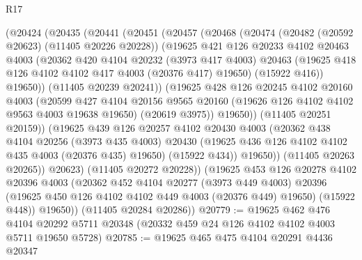 \begin{lexlean}{R17}
\begin{coremodule}
          (@20424
            (@20435
              (@20441
                (@20451
                  (@20457
                    (@20468
                      (@20474
                        (@20482 (@20592 @20623) (@11405 @20226 @20228))
                        (@19625
                          @421
                          @126
                          @20233
                          @4102
                          @20463
                          @4003
                          (@20362
                            @420
                            @4104
                            @20232
                            (@3973 @417 @4003)
                            @20463
                            (@19625 @418 @126 @4102 @4102 @417 @4003 (@20376 @417) @19650)
                            (@15922 @416))
                          @19650))
                      (@11405 @20239 @20241))
                    (@19625
                      @428
                      @126
                      @20245
                      @4102
                      @20160
                      @4003
                      (@20599
                        @427
                        @4104
                        @20156
                        @9565
                        @20160
                        (@19626 @126 @4102 @4102 @9563 @4003 @19638 @19650)
                        (@20619 @3975))
                      @19650))
                  (@11405 @20251 @20159))
                (@19625
                  @439
                  @126
                  @20257
                  @4102
                  @20430
                  @4003
                  (@20362
                    @438
                    @4104
                    @20256
                    (@3973 @435 @4003)
                    @20430
                    (@19625 @436 @126 @4102 @4102 @435 @4003 (@20376 @435) @19650)
                    (@15922 @434))
                  @19650))
              (@11405 @20263 @20265))
            @20623)
          (@11405 @20272 @20228))
        (@19625
          @453
          @126
          @20278
          @4102
          @20396
          @4003
          (@20362
            @452
            @4104
            @20277
            (@3973 @449 @4003)
            @20396
            (@19625 @450 @126 @4102 @4102 @449 @4003 (@20376 @449) @19650)
            (@15922 @448))
          @19650))
      (@11405 @20284 @20286))
@20779 := @19625
    @462
    @476
    @4104
    @20292
    @5711
    @20348
    (@20332 @459 @24 @126 @4102 @4102 @4003 @5711 @19650 @5728)
@20785 := @19625 @465 @475 @4104 @20291 @4436 @20347

\end{coremodule}
\end{lexlean}
